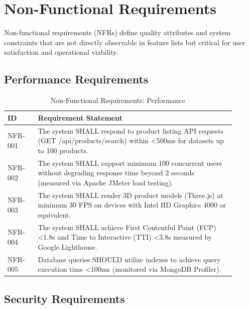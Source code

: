 \documentclass[12pt, a4paper]{report}
\begin{document}
\section{Non-Functional Requirements}

Non-functional requirements (NFRs) define quality attributes and system constraints that are not directly observable in feature lists but critical for user satisfaction and operational viability.

\subsection{Performance Requirements}

\begin{table}[H]
\centering
\caption{Non-Functional Requirements: Performance}
\label{tab:nfr_performance}
\small
\begin{tabular}{@{}p{0.12\linewidth}p{0.78\linewidth}@{}}
\toprule
\textbf{ID} & \textbf{Requirement Statement} \\
\midrule
NFR-001 & The system SHALL respond to product listing API requests (GET /api/products/search) within \textless 500ms for datasets up to 100 products. \\
NFR-002 & The system SHALL support minimum 100 concurrent users without degrading response time beyond 2 seconds (measured via Apache JMeter load testing). \\
NFR-003 & The system SHALL render 3D product models (Three.js) at minimum 30 FPS on devices with Intel HD Graphics 4000 or equivalent. \\
NFR-004 & The system SHALL achieve First Contentful Paint (FCP) \textless 1.8s and Time to Interactive (TTI) \textless 3.8s measured by Google Lighthouse. \\
NFR-005 & Database queries SHOULD utilize indexes to achieve query execution time \textless 100ms (monitored via MongoDB Profiler). \\
\bottomrule
\end{tabular}
\end{table}

\subsection{Security Requirements}
\end{document}
